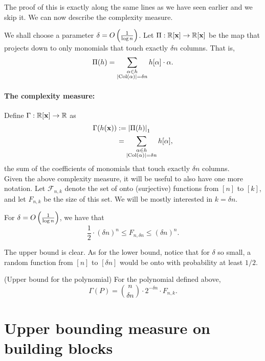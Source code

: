 \noindent
The proof of this is exactly along the same lines as we have seen earlier and we skip it. We can now describe the complexity measure.

We shall choose a parameter $\delta  = O\left(\frac{1}{\log n}\right)$. Let $\Pi:\mathbb{R}[\mathbf{x}] \rightarrow \mathbb{R}[\mathbf{x}]$ be the map that projects down to only monomials that touch exactly $\delta n$ columns. That is,
\[
  \Pi(h) = \sum_{\substack{\alpha \in h \\ \left|\operatorname{Col}(\alpha)\right| = \delta n}} h[\alpha] \cdot \alpha.
\]

\paragraph{The complexity measure:} Define $\Gamma:\mathbb{R}[\mathbf{x}] \rightarrow \mathbb{R}$ as
\begin{align*}
  \Gamma(h(\mathbf{x})) & := \left|\Pi(h)\right|_1 \\
                   & = \sum_{\substack{\alpha \in h \\ \left|\operatorname{Col}(\alpha)\right| = \delta n}} h[\alpha],
\end{align*}
the sum of the coefficients of monomials that touch exactly $\delta n$ columns. \\

Given the above complexity measure, it will be useful to also have one more notation. Let $\mathcal{F}_{n,k}$ denote the set of onto (surjective) functions from $[n]$ to $[k]$, and let $F_{n,k}$ be the size of this set. We will be mostly interested in $k = \delta n$.

\begin{proposition}\label{prop:bound-on-onto-fns}
  For $\delta = O\left(\frac{1}{\log n}\right)$, we have that
  \[
    \frac{1}{2}\cdot (\delta n)^n \leq  F_{n,\delta n} \leq (\delta n)^n.
  \]
\end{proposition}
\begin{proof-sketch}
  The upper bound is clear. As for the lower bound, notice that for $\delta$ so small, a random function from $[n]$ to $[\delta n]$ would be onto with probability at least $1/2$.
\end{proof-sketch}

\begin{lemmawp}(Upper bound for the polynomial) \label{lemma:monVPVNP-ub-for-poly} For the polynomial defined above,
  \[
    \Gamma(P) = \binom{n}{\delta n} \cdot  2^{-\delta n} \cdot F_{n,k}.
  \]
\end{lemmawp}

\section{Upper bounding measure on building blocks}

